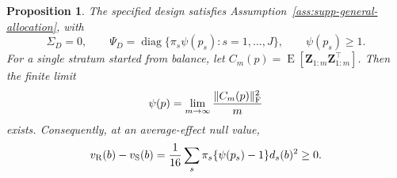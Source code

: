 \documentclass[12pt,a4paper]{article}
\newtheorem{proposition}{Proposition}
\theoremstyle{definition}
\theoremstyle{remark}\newtheorem{remark}{Remark}
\numberwithin{equation}{section}
\newcommand{\E}{\operatorname{E}}
\newcommand{\diag}{\operatorname{diag}}
\begin{document}
\begin{proposition}\label{prop:supp-efron}
The specified design satisfies Assumption~\ref{ass:supp-general-allocation}, with
\begin{equation}\label{eq:supp-efron-cov}
 \Sigma_D=0,\qquad \Psi_D=\diag\{\pi_s\psi(p_s):s=1,\ldots,J\},\qquad \psi(p_s)\ge1.
\end{equation}
For a single stratum started from balance, let $C_m(p)=\E[\bm Z_{1:m}\bm Z_{1:m}^\top]$. Then the finite limit
\begin{equation}\label{eq:supp-efron-psi}
 \psi(p)=\lim_{m\to\infty}\frac{\|C_m(p)\|_{\rm F}^2}{m}
\end{equation}
exists. Consequently, at an average-effect null value,
\[
 v_{\rm R}(b)-v_{\rm S}(b)
      =\frac1{16}\sum_s\pi_s\{\psi(p_s)-1\}d_s(b)^2\ge0.
\]
\end{proposition}
\end{document}

